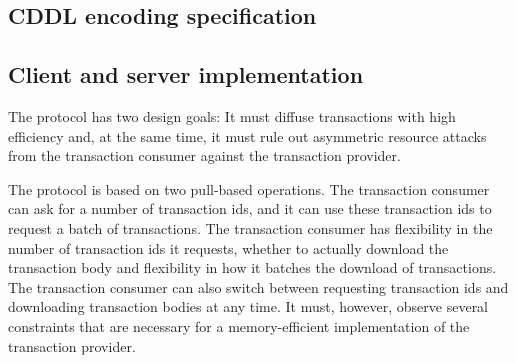 \subsection{CDDL encoding specification}
\label{object-diffusion-cddl}




\subsection{Client and server implementation}


The protocol has two design goals: It must diffuse transactions with high efficiency
and, at the same time, it must rule out
asymmetric resource attacks from the transaction consumer against the transaction provider.

The protocol is based on two pull-based operations.
The transaction consumer can ask for a number of transaction ids, and it can use these
transaction ids to request a batch of transactions.
The transaction consumer has flexibility in the number of transaction ids it requests,
whether to actually download the transaction body
and flexibility in how it batches the download of transactions.
The transaction consumer can also switch between requesting transaction ids and downloading
transaction bodies at any time.
It must, however, observe several constraints that are necessary for a memory-efficient implementation
of the transaction provider.

